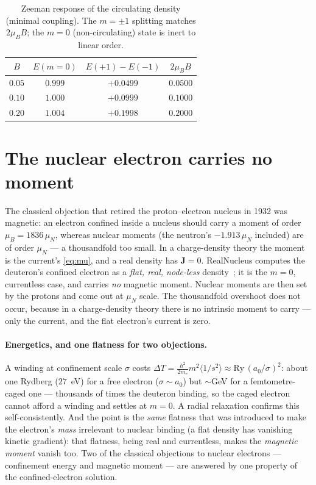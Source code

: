 \documentclass[11pt]{article}
\begin{document}
\begin{table}[h]
\centering\small
\begin{tabular}{cccc}
\toprule
$B$ & $E(m{=}0)$ & $E(+1)-E(-1)$ & $2\mu_B B$ \\
\midrule
$0.05$ & $0.999$ & $+0.0499$ & $0.0500$ \\
$0.10$ & $1.000$ & $+0.0999$ & $0.1000$ \\
$0.20$ & $1.004$ & $+0.1998$ & $0.2000$ \\
\bottomrule
\end{tabular}
\caption{Zeeman response of the circulating density (minimal coupling). The $m=\pm1$ splitting matches
$2\mu_B B$; the $m=0$ (non-circulating) state is inert to linear order.}
\label{tab:zeeman}
\end{table}

\section{The nuclear electron carries no moment}
\label{sec:nuclear}

The classical objection that retired the proton--electron nucleus in 1932 was magnetic: an electron
confined inside a nucleus should carry a moment of order $\mu_B=1836\,\mu_N$, whereas nuclear moments (the
neutron's $-1.913\,\mu_N$ included) are of order $\mu_N$ --- a thousandfold too small. In a charge-density
theory the moment is the current's \eqref{eq:mu}, and a real density has $\mathbf J=0$. RealNucleus
computes the deuteron's confined electron as a \emph{flat, real, node-less} density~\cite{RealNucleus};
it is the $m=0$, currentless case, and carries \emph{no} magnetic moment. Nuclear moments are then set by
the protons and come out at $\mu_N$ scale. The thousandfold overshoot does not occur, because in a
charge-density theory there is no intrinsic moment to carry --- only the current, and the flat electron's
current is zero.

\paragraph{Energetics, and one flatness for two objections.} A winding at confinement scale $\sigma$ costs
$\Delta T=\tfrac{\hbar^2}{2m_e}m^2\langle1/s^2\rangle\approx\mathrm{Ry}\,(a_0/\sigma)^2$: about one Rydberg
($27$~eV) for a free electron ($\sigma\sim a_0$) but $\sim$GeV for a femtometre-caged one --- thousands of
times the deuteron binding, so the caged electron cannot afford a winding and settles at $m=0$. A radial
relaxation confirms this self-consistently. And the point is the \emph{same} flatness that was introduced
to make the electron's \emph{mass} irrelevant to nuclear binding (a flat density has vanishing kinetic
gradient): that flatness, being real and currentless, makes the \emph{magnetic moment} vanish too. Two
of the classical objections to nuclear electrons --- confinement energy and magnetic moment --- are
answered by one property of the confined-electron solution.
\end{document}

